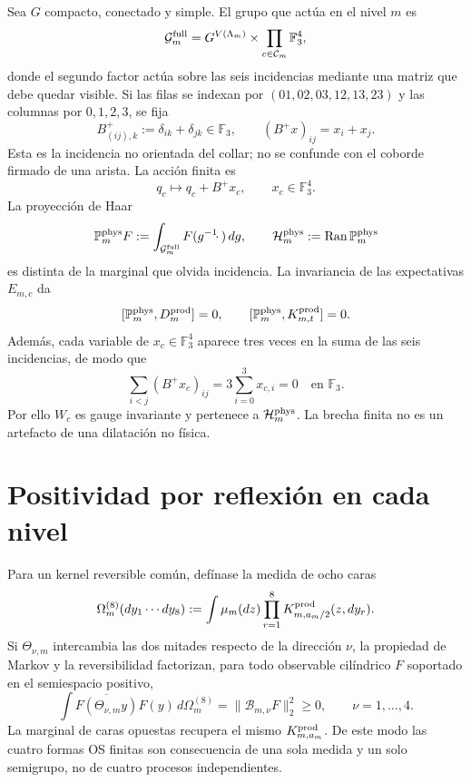 Sea $G$ compacto, conectado y simple. El grupo que actúa en el nivel $m$ es
\[
 \mathcal G_m^{\rm full}
 =G^{V(\Lambda_m)}\times
  \prod_{c\in\mathcal C_m}\mathbb F_3^4,
\]
donde el segundo factor actúa sobre las seis incidencias mediante una matriz
que debe quedar visible. Si las filas se indexan por
$(01,02,03,12,13,23)$ y las columnas por $0,1,2,3$, se fija
\begin{equation}\label{eq:pdf2-ym-incidence-matrix}
 B^+_{(ij),k}:=\delta_{ik}+\delta_{jk}\in\mathbb F_3,
 \qquad
 (B^+x)_{ij}=x_i+x_j.
\end{equation}
Esta es la incidencia no orientada del collar; no se confunde con el
coborde firmado de una arista. La acción finita es
\begin{equation}\label{eq:pdf2-ym-incidence-action}
 q_c\longmapsto q_c+B^+x_c,
 \qquad x_c\in\mathbb F_3^4.
\end{equation}
La proyección de Haar
\begin{equation}\label{eq:pdf2-ym-proyeccion-fisica}
 \mathbb P_m^{\rm phys}F
 :=\int_{\mathcal G_m^{\rm full}}F(g^{-1}\!\cdot\,)\,dg,
 \qquad
 \mathcal H_m^{\rm phys}:=\operatorname{Ran}\mathbb P_m^{\rm phys}
\end{equation}
es distinta de la marginal que olvida incidencia. La invariancia de las
expectativas $E_{m,c}$ da
\begin{equation}\label{eq:pdf2-ym-reduccion}
 [\mathbb P_m^{\rm phys},D_m^{\rm prod}]=0,
 \qquad
 [\mathbb P_m^{\rm phys},K_{m,t}^{\rm prod}]=0.
\end{equation}
Además, cada variable de $x_c\in\mathbb F_3^4$ aparece tres veces en la suma de
las seis incidencias, de modo que
\begin{equation}\label{eq:pdf2-ym-incidence-conservation}
 \sum_{i<j}(B^+x_c)_{ij}
 =3\sum_{i=0}^3x_{c,i}=0
 \quad\text{en }\mathbb F_3.
\end{equation}
Por ello $W_c$ es gauge
invariante y pertenece a $\mathcal H_m^{\rm phys}$. La brecha finita no es un
artefacto de una dilatación no física.

\section{Positividad por reflexión en cada nivel}

Para un kernel reversible común, defínase la medida de ocho caras
\begin{equation}\label{eq:pdf2-ym-ocho-caras}
 \Omega_m^{(8)}(dy_1\cdots dy_8)
 :=\int\mu_m(dz)\prod_{r=1}^{8}K^{\rm prod}_{m,a_m/2}(z,dy_r).
\end{equation}
Si $\Theta_{\nu,m}$ intercambia las dos mitades respecto de la dirección
$\nu$, la propiedad de Markov y la reversibilidad factorizan, para todo observable
cilíndrico $F$ soportado en el semiespacio positivo,
\begin{equation}\label{eq:pdf2-ym-os-finita}
 \int\overline{F(\Theta_{\nu,m}y)}F(y)\,d\Omega_m^{(8)}
 =\|\mathcal B_{m,\nu}F\|_2^2\ge0,
 \qquad \nu=1,\ldots,4.
\end{equation}
La marginal de caras opuestas recupera el mismo
$K^{\rm prod}_{m,a_m}$. De este modo las cuatro formas OS finitas son
consecuencia de una sola medida y un solo semigrupo, no de cuatro procesos
independientes.

